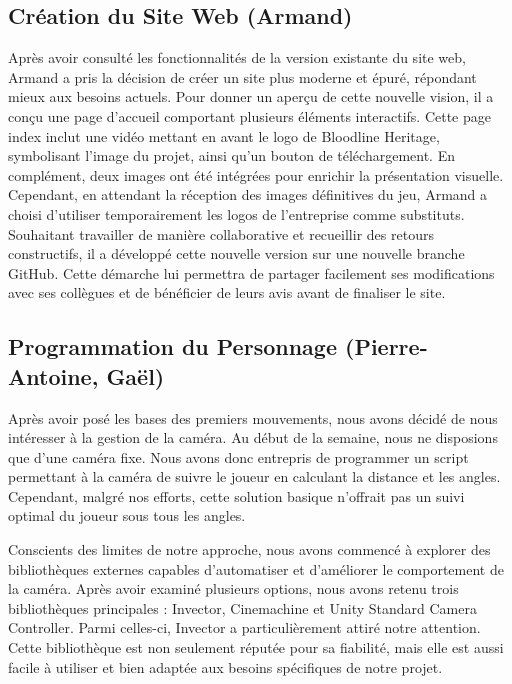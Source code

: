 \documentclass{report}
\begin{document}
\subsection*{Création du Site Web (Armand)}
Après avoir consulté les fonctionnalités de la version existante du site web, Armand a pris la décision de créer un site plus moderne et épuré, répondant mieux aux besoins actuels. Pour donner un aperçu de cette nouvelle vision, il a conçu une page d'accueil comportant plusieurs éléments interactifs. Cette page index inclut une vidéo mettant en avant le logo de Bloodline Heritage, symbolisant l'image du projet, ainsi qu'un bouton de téléchargement. En complément, deux images ont été intégrées pour enrichir la présentation visuelle. Cependant, en attendant la réception des images définitives du jeu, Armand a choisi d'utiliser temporairement les logos de l'entreprise comme substituts. Souhaitant travailler de manière collaborative et recueillir des retours constructifs, il a développé cette nouvelle version sur une nouvelle branche GitHub. Cette démarche lui permettra de partager facilement ses modifications avec ses collègues et de bénéficier de leurs avis avant de finaliser le site.

\subsection*{Programmation du Personnage (Pierre-Antoine, Gaël)}

Après avoir posé les bases des premiers mouvements, nous avons décidé de nous intéresser à la gestion de la caméra. Au début de la semaine, nous ne disposions que d'une caméra fixe. Nous avons donc entrepris de programmer un script permettant à la caméra de suivre le joueur en calculant la distance et les angles. Cependant, malgré nos efforts, cette solution basique n’offrait pas un suivi optimal du joueur sous tous les angles.

Conscients des limites de notre approche, nous avons commencé à explorer des bibliothèques externes capables d’automatiser et d’améliorer le comportement de la caméra. Après avoir examiné plusieurs options, nous avons retenu trois bibliothèques principales : Invector, Cinemachine et Unity Standard Camera Controller. Parmi celles-ci, Invector a particulièrement attiré notre attention. Cette bibliothèque est non seulement réputée pour sa fiabilité, mais elle est aussi facile à utiliser et bien adaptée aux besoins spécifiques de notre projet.
\end{document}
